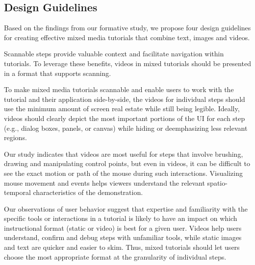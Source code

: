 \subsection{Design Guidelines}

Based on the findings from our formative study, we propose four design guidelines for creating effective mixed media tutorials that combine text, images and videos.

 Scannable steps provide valuable context and facilitate navigation within tutorials. To leverage these benefits, videos in mixed tutorials should be presented in a format that supports scanning.

 To make mixed media tutorials scannable and enable users to work with the tutorial and their application side-by-side, the videos for individual steps should use the minimum amount of screen real estate while still being legible. Ideally, videos should clearly depict the most important portions of the UI for each step (e.g., dialog boxes, panels, or canvas) while hiding or deemphasizing less relevant regions.

 Our study indicates that videos are most useful for steps that involve brushing, drawing and manipulating control points, but even in videos, it can be difficult to see the exact motion or path of the mouse during such interactions. Visualizing mouse movement and events helps viewers understand the relevant spatio-temporal characteristics of the demonstration.

 Our observations of user behavior suggest that expertise and familiarity with the specific tools or interactions in a tutorial is likely to have an impact on which instructional format (static or video) is best for a given user. Videos help users understand, confirm and debug steps with unfamiliar tools, while static images and text are quicker and easier to skim. Thus, mixed tutorials should let users choose the most appropriate format at the granularity of individual steps.
